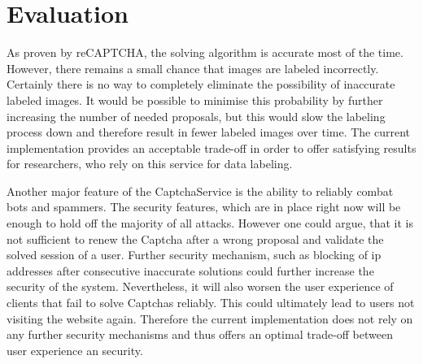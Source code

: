 \section{Evaluation}
\label{sec:evaluation}

As proven by reCAPTCHA, the solving algorithm is accurate most of the time. However, there remains a small chance that images are labeled incorrectly. Certainly there is no way to completely eliminate the possibility of inaccurate labeled images. It would be possible to minimise this probability by further increasing the number of needed proposals, but this would slow the labeling process down and therefore result in fewer labeled images over time. The current implementation provides an acceptable trade-off in order to offer satisfying results for researchers, who rely on this service for data labeling.

Another major feature of the CaptchaService is the ability to reliably combat bots and spammers. The security features, which are in place right now will be enough to hold off the majority of all attacks. However one could argue, that it is not sufficient to renew the Captcha after a wrong proposal and validate the solved session of a user. Further security mechanism, such as blocking of ip addresses after consecutive inaccurate solutions could further increase the security of the system. Nevertheless, it will also worsen the user experience of clients that fail to solve Captchas reliably. This could ultimately lead to users not visiting the website again. Therefore the current implementation does not rely on any further security mechanisms and thus offers an optimal trade-off between user experience an security.

\clearpage
